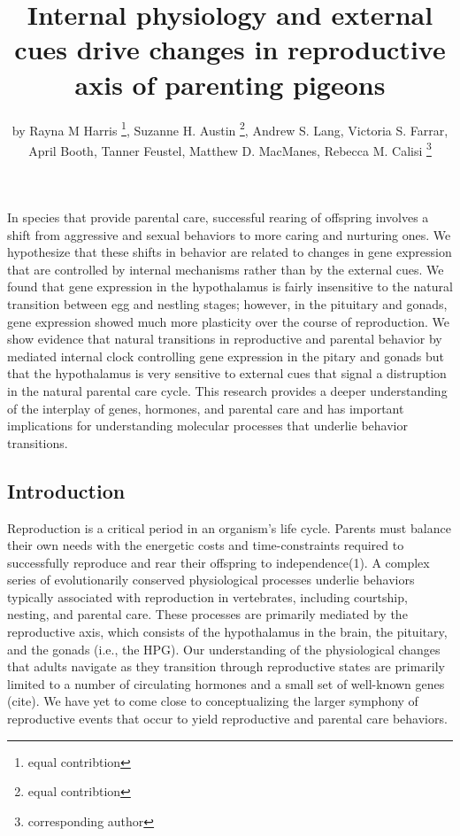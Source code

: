 \title{Internal physiology and external cues drive changes in reproductive axis
of parenting pigeons}
\author{by Rayna M Harris \footnote{equal contribtion}, Suzanne H. Austin \footnote{equal contribtion}, Andrew S. Lang, Victoria S. Farrar, April Booth, Tanner Feustel, Matthew D. MacManes, Rebecca M. Calisi \footnote{corresponding author}}

\maketitle



In species that provide parental care, successful rearing of offspring involves a shift from aggressive and sexual behaviors to more caring and nurturing ones.  We hypothesize that these shifts in behavior are related to changes in gene expression that are controlled by internal mechanisms rather than by the external cues.  We found that gene expression in the hypothalamus is fairly insensitive to the natural transition between egg and nestling stages; however, in the pituitary and gonads, gene expression showed much more plasticity over the course of reproduction. We show evidence that natural transitions in reproductive and parental behavior by mediated internal clock controlling gene expression in the pitary and gonads but that the hypothalamus is very sensitive to external cues that signal a distruption in the natural parental care cycle. This research provides a deeper understanding of the interplay of genes, hormones, and parental care and has important implications for understanding molecular processes that underlie behavior transitions.

\hypertarget{introduction}{%
\subsection{Introduction}\label{introduction}}

Reproduction is a critical period in an organism's life cycle. Parents
must balance their own needs with the energetic costs and
time-constraints required to successfully reproduce and rear their
offspring to independence(1). A complex series of evolutionarily
conserved physiological processes underlie behaviors typically
associated with reproduction in vertebrates, including courtship,
nesting, and parental care. These processes are primarily mediated by
the reproductive axis, which consists of the hypothalamus in the brain,
the pituitary, and the gonads (i.e., the HPG). Our understanding of the
physiological changes that adults navigate as they transition through
reproductive states are primarily limited to a number of circulating
hormones and a small set of well-known genes (cite). We have yet to come
close to conceptualizing the larger symphony of reproductive events that
occur to yield reproductive and parental care behaviors.

